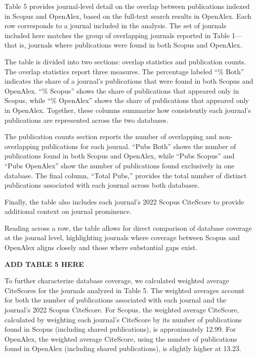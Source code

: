 \documentclass[
  letterpaper,
  DIV=11,
  numbers=noendperiod]{scrartcl}
\begin{document}
Table 5 provides journal-level detail on the overlap between
publications indexed in Scopus and OpenAlex, based on the full-text
search results in OpenAlex. Each row corresponds to a journal included
in the analysis. The set of journals included here matches the group of
overlapping journals reported in Table 1---that is, journals where
publications were found in both Scopus and OpenAlex.

The table is divided into two sections: overlap statistics and
publication counts. The overlap statistics report three measures. The
percentage labeled ``\% Both'' indicates the share of a journal's
publications that were found in both Scopus and OpenAlex. ``\% Scopus''
shows the share of publications that appeared only in Scopus, while ``\%
OpenAlex'' shows the share of publications that appeared only in
OpenAlex. Together, these columns summarize how consistently each
journal's publications are represented across the two databases.

The publication counts section reports the number of overlapping and
non-overlapping publications for each journal. ``Pubs Both'' shows the
number of publications found in both Scopus and OpenAlex, while ``Pubs
Scopus'' and ``Pubs OpenAlex'' show the number of publications found
exclusively in one database. The final column, ``Total Pubs,'' provides
the total number of distinct publications associated with each journal
across both databases.

Finally, the table also includes each journal's 2022 Scopus CiteScore to
provide additional context on journal prominence.

Reading across a row, the table allows for direct comparison of database
coverage at the journal level, highlighting journals where coverage
between Scopus and OpenAlex aligns closely and those where substantial
gaps exist.

\textbf{ADD TABLE 5 HERE}

To further characterize database coverage, we calculated weighted
average CiteScores for the journals analyzed in Table 5. The weighted
averages account for both the number of publications associated with
each journal and the journal's 2022 Scopus CiteScore. For Scopus, the
weighted average CiteScore, calculated by weighting each journal's
CiteScore by its number of publications found in Scopus (including
shared publications), is approximately 12.99. For OpenAlex, the weighted
average CiteScore, using the number of publications found in OpenAlex
(including shared publications), is slightly higher at 13.23.
\end{document}
